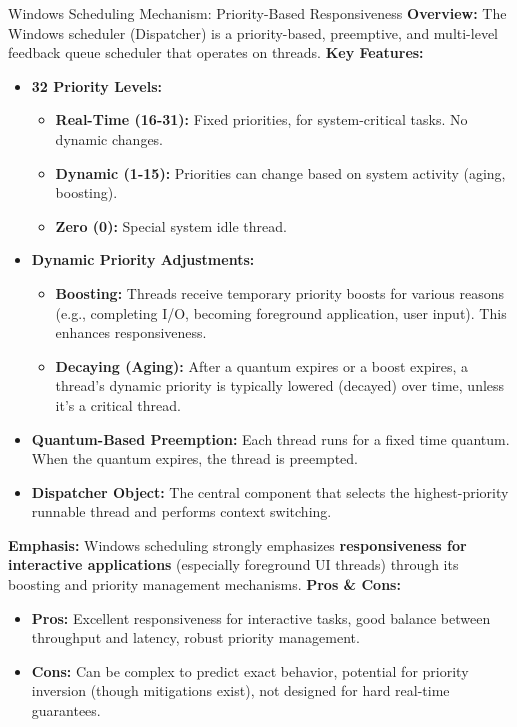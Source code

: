 \documentclass[aspectratio=169,11pt]{beamer}
\begin{document}
\begin{frame}[allowframebreaks]{Windows Scheduling Mechanism: Priority-Based Responsiveness}
  \small
  \textbf{Overview:} The Windows scheduler (Dispatcher) is a priority-based, preemptive, and multi-level feedback queue scheduler that operates on threads.
  \vspace{0.3cm}
  \textbf{Key Features:}
  \begin{itemize}
    \item \textbf{32 Priority Levels:}
      \begin{itemize}
        \item \textbf{Real-Time (16-31):} Fixed priorities, for system-critical tasks. No dynamic changes.
        \item \textbf{Dynamic (1-15):} Priorities can change based on system activity (aging, boosting).
        \item \textbf{Zero (0):} Special system idle thread.
      \end{itemize}
\framebreak
    \item \textbf{Dynamic Priority Adjustments:}
      \begin{itemize}
        \item \textbf{Boosting:} Threads receive temporary priority boosts for various reasons (e.g., completing I/O, becoming foreground application, user input). This enhances responsiveness.
        \item \textbf{Decaying (Aging):} After a quantum expires or a boost expires, a thread's dynamic priority is typically lowered (decayed) over time, unless it's a critical thread.
      \end{itemize}
    \item \textbf{Quantum-Based Preemption:} Each thread runs for a fixed time quantum. When the quantum expires, the thread is preempted.
    \item \textbf{Dispatcher Object:} The central component that selects the highest-priority runnable thread and performs context switching.
  \end{itemize}
\framebreak
  \vspace{0.3cm}
  \textbf{Emphasis:} Windows scheduling strongly emphasizes \textbf{responsiveness for interactive applications} (especially foreground UI threads) through its boosting and priority management mechanisms.
  \vspace{0.3cm}
  \textbf{Pros \& Cons:}
  \begin{itemize}
    \item \textbf{\textcolor{green!50!black}{Pros:}} Excellent responsiveness for interactive tasks, good balance between throughput and latency, robust priority management.
    \item \textbf{\textcolor{red!70!black}{Cons:}} Can be complex to predict exact behavior, potential for priority inversion (though mitigations exist), not designed for hard real-time guarantees.
  \end{itemize}
\end{frame}
\end{document}

